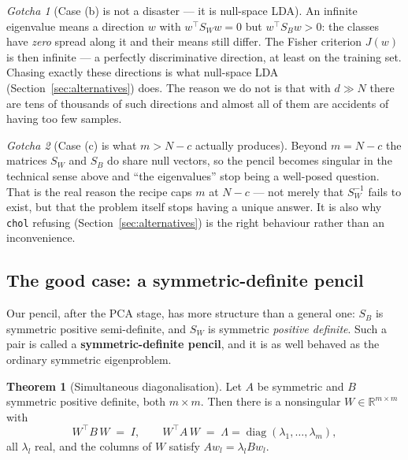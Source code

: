 \documentclass[11pt]{article}
\theoremstyle{definition}
\newtheorem{theorem}{Theorem}[section]
\theoremstyle{remark}
\newtheorem*{gotcha}{Gotcha}
\newcommand{\Sw}{S_W}
\newcommand{\Sb}{S_B}
\newcommand{\R}{\mathbb{R}}
\begin{document}
\begin{gotcha}[Case (b) is not a disaster --- it is null-space LDA]
An infinite eigenvalue means a direction $w$ with $w^{\!\top}\Sw w = 0$ but
$w^{\!\top}\Sb w > 0$: the classes have \emph{zero} spread along it and their means
still differ. The Fisher criterion $J(w)$ is then infinite --- a perfectly
discriminative direction, at least on the training set. Chasing exactly these
directions is what null-space LDA (Section~\ref{sec:alternatives}) does. The
reason we do not is that with $d\gg N$ there are tens of thousands of such
directions and almost all of them are accidents of having too few samples.
\end{gotcha}

\begin{gotcha}[Case (c) is what $m>N-c$ actually produces]
Beyond $m = N-c$ the matrices $\Sw$ and $\Sb$ do share null vectors, so the pencil
becomes singular in the technical sense above and ``the eigenvalues'' stop being a
well-posed question. That is the real reason the recipe caps $m$ at $N-c$ --- not
merely that $\Sw^{-1}$ fails to exist, but that the problem itself stops having a
unique answer. It is also why \texttt{chol} refusing (Section~\ref{sec:alternatives})
is the right behaviour rather than an inconvenience.
\end{gotcha}

\subsection{The good case: a symmetric-definite pencil}

Our pencil, after the PCA stage, has more structure than a general one:
$\Sb$ is symmetric positive semi-definite, and $\Sw$ is symmetric
\emph{positive definite}. Such a pair is called a \textbf{symmetric-definite
pencil}, and it is as well behaved as the ordinary symmetric eigenproblem.

\begin{theorem}[Simultaneous diagonalisation]
\label{thm:simdiag}
Let $A$ be symmetric and $B$ symmetric positive definite, both $m\times m$. Then
there is a nonsingular $W\in\R^{m\times m}$ with
\[
  W^{\!\top} B\, W \;=\; I,
  \qquad
  W^{\!\top} A\, W \;=\; \Lambda = \operatorname{diag}(\lambda_1,\dots,\lambda_m),
\]
all $\lambda_l$ real, and the columns of $W$ satisfy $A w_l = \lambda_l B w_l$.
\end{theorem}
\end{document}

